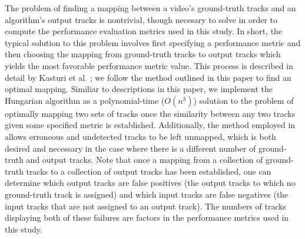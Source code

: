 \documentclass[smallcondensed, final]{svjour3}
\begin{document}
The problem of finding a mapping between a video's ground-truth tracks and an algorithm's output tracks is nontrivial, though necesary to solve in order to compute the performance evaluation metrics used in this study. In short, the typical solution to this problem involves first specifying a performance metric and then choosing the mapping from ground-truth tracks to output tracks which yields the most favorable performance metric value. This process is described in detail by Kasturi et al. \cite{kasturi_2008}; we follow the method outlined in this paper to find an optimal mapping. Similiar to descriptions in this paper, we implement the Hungarian algorithm \cite{munkres_1957} as a polynomial-time ($O(n^{3})$) solution to the problem of optimally mapping two sets of tracks once the similarity between any two tracks given some specified metric is established. Additionally, the method employed in \cite{kasturi_2008} allows erroneous and undetected tracks to be left unmapped, which is both desired and necessary in the case where there is a different number of ground-truth and output tracks. Note that once a mapping from a collection of ground-truth tracks to a collection of output tracks has been established, one can determine which output tracks are false positives (the output tracks to which no ground-truth track is assigned) and which input tracks are false negatives (the input tracks that are not assigned to an output track). The numbers of tracks displaying both of these failures are factors in the performance metrics used in this study.




\end{document}
